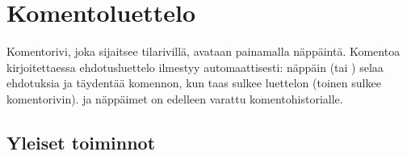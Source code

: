 \documentclass[letterpaper,10pt,finnish]{sphinxmanual}
\begin{document}
\sphinxstepscope


\section{Komentoluettelo}
\label{\detokenize{cmd_mode:liste-des-commandes}}\label{\detokenize{cmd_mode:cmd-mode}}\label{\detokenize{cmd_mode::doc}}
\sphinxAtStartPar
Komentorivi, joka sijaitsee tilarivillä, avataan painamalla \sphinxhyphen{}näppäintä. Komentoa kirjoitettaessa ehdotusluettelo ilmestyy automaattisesti: \sphinxhyphen{}näppäin (tai ) selaa ehdotuksia ja täydentää komennon, kun taas  sulkee luettelon (toinen  sulkee komentorivin). \sphinxhyphen{} ja \sphinxhyphen{}näppäimet on edelleen varattu komentohistorialle.


\subsection{Yleiset toiminnot}
\label{\detokenize{cmd_mode:operations-globales}}\label{\detokenize{cmd_mode:cmd-global}}
\end{document}
